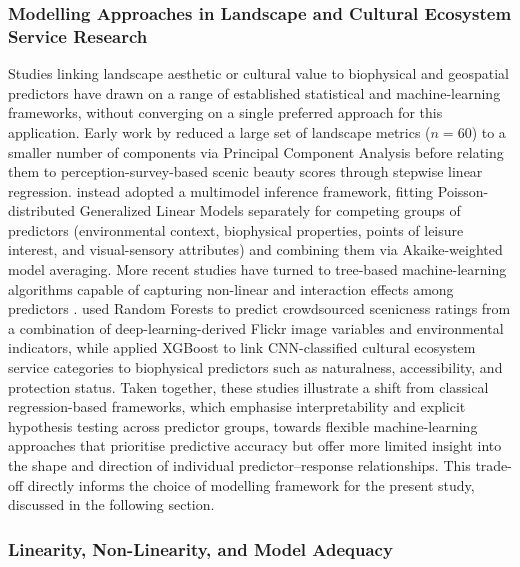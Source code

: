 \documentclass[hidelinks, 11pt]{article}
\begin{document}
\subsubsection{Modelling Approaches in Landscape and Cultural Ecosystem Service Research}

Studies linking landscape aesthetic or cultural value to biophysical and geospatial predictors have drawn on a range of established statistical and machine-learning frameworks, without converging on a single preferred approach for this application. Early work by \citet{schirpke_predicting_2013} reduced a large set of landscape metrics ($n = 60$) to a smaller number of components via Principal Component Analysis before relating them to perception-survey-based scenic beauty scores through stepwise linear regression. \citet{vaz_digital_2020} instead adopted a multimodel inference framework, fitting Poisson-distributed Generalized Linear Models separately for competing groups of predictors (environmental context, biophysical properties, points of leisure interest, and visual-sensory attributes) and combining them via Akaike-weighted model averaging. More recent studies have turned to tree-based machine-learning algorithms capable of capturing non-linear and interaction effects among predictors \citep{comalada_modelling_2025,havinga_social_2021}. \citet{havinga_social_2021} used Random Forests to predict crowdsourced scenicness ratings from a combination of deep-learning-derived Flickr image variables and environmental indicators, while \citet{comalada_modelling_2025} applied XGBoost to link CNN-classified cultural ecosystem service categories to biophysical predictors such as naturalness, accessibility, and protection status. Taken together, these studies illustrate a shift from classical regression-based frameworks, which emphasise interpretability and explicit hypothesis testing across predictor groups, towards flexible machine-learning approaches that prioritise predictive accuracy but offer more limited insight into the shape and direction of individual predictor--response relationships. This trade-off directly informs the choice of modelling framework for the present study, discussed in the following section.

\subsubsection{Linearity, Non-Linearity, and Model Adequacy}
\end{document}

